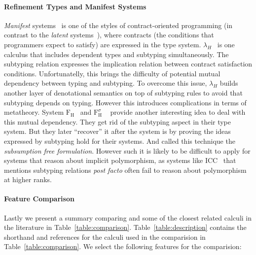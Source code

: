 \paragraph{Refinement Types and Manifest Systems}

\emph{Manifest} systems~\citep{manifestcontracts} is one of the styles of
contract-oriented programming (in contrast to the \emph{latent} systems~\citep{latentcontracts}),
where contracts (the conditions that programmers expect to satisfy) are expressed
in the type system. $\lambda_H$~\citep{hybridtypes,manifestcontracts} is one calculus that
includes dependent types and subtyping simultaneously. The subtyping relation
expresses the implication relation between contract satisfaction conditions. Unfortunatelly,
this brings the difficulty of potential mutual dependency between typing and subtyping.
To overcome this issue, $\lambda_H$ builds another layer of denotational semantics on top of
subtyping rules to avoid that subtyping depends on typing. However this introduces
complications in terms of metatheory.
System $\mathrm{F}_\mathrm{H}$~\citep{fh} and $\mathrm{F}_\mathrm{H}^\sigma$
~\citep{fhsigma} provide another
interesting idea to deal with this mutual dependency. They get rid of the
subtyping aspect in their type system. But they later ``recover'' it after
the system is by proving the ideas expressed by subtyping hold for their systems.
And \citet{fhsigma} called this technique the \emph{subsumption free formulation}.
However such it is likely to be difficult to apply for systems that
reason about implicit polymorphism,
as systems like ICC~\citep{miquel2001implicit} that mentions subtyping relations
\emph{post facto} often fail to reason about polymorphism at higher ranks.

\paragraph{Feature Comparison}
Lastly we present a summary comparing \name and some of the closest related calculi
in the literature in Table~\ref{table:comparison}. Table~\ref{table:description} contains the
shorthand and references for the calculi used in the comparision in Table~\ref{table:comparison}.
We select the following features for the comparision:


